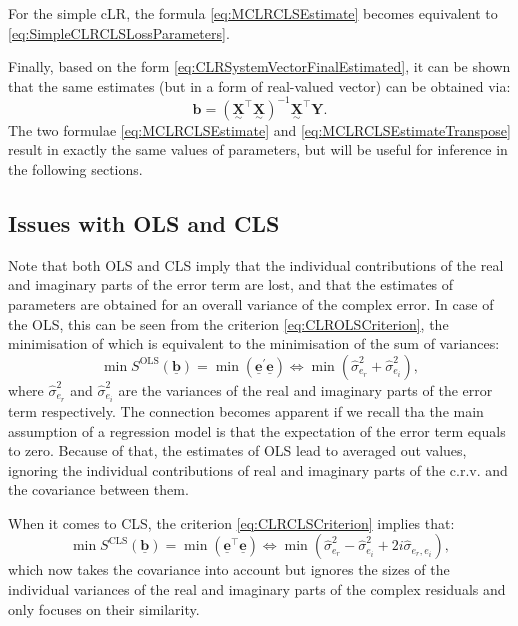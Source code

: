 \documentclass[
]{book}
\begin{document}
For the simple cLR, the formula \eqref{eq:MCLRCLSEstimate} becomes equivalent to \eqref{eq:SimpleCLRCLSLossParameters}.

Finally, based on the form \eqref{eq:CLRSystemVectorFinalEstimated}, it can be shown that the same estimates (but in a form of real-valued vector) can be obtained via:
\begin{equation}
    \boldsymbol{b} = \left( \underset{\sim}{\mathbf{X}}^\top \underset{\sim}{\mathbf{X}}\right)^{-1} \underset{\sim}{\mathbf{{X}}}^\top {\mathbf{Y}} .
    \label{eq:MCLRCLSEstimateTranspose}
\end{equation}
The two formulae \eqref{eq:MCLRCLSEstimate} and \eqref{eq:MCLRCLSEstimateTranspose} result in exactly the same values of parameters, but will be useful for inference in the following sections.

\hypertarget{CLREstimationIssue}{%
\subsection{Issues with OLS and CLS}\label{CLREstimationIssue}}

Note that both OLS and CLS imply that the individual contributions of the real and imaginary parts of the error term are lost, and that the estimates of parameters are obtained for an overall variance of the complex error. In case of the OLS, this can be seen from the criterion \eqref{eq:CLROLSCriterion}, the minimisation of which is equivalent to the minimisation of the sum of variances:
\begin{equation}
    \min S^{\mathrm{OLS}}(\underline{\boldsymbol{b}}) = \min \left(\underline{\mathbf{e}}^\prime \underline{\mathbf{e}}\right) \iff \min \left(\hat{\sigma}_{e_r}^2 + \hat{\sigma}_{e_i}^2 \right),
    \label{eq:CLROLSCriterionVariance}
\end{equation}
where \(\hat{\sigma}_{e_r}^2\) and \(\hat{\sigma}_{e_i}^2\) are the variances of the real and imaginary parts of the error term respectively. The connection becomes apparent if we recall tha the main assumption of a regression model is that the expectation of the error term equals to zero. Because of that, the estimates of OLS lead to averaged out values, ignoring the individual contributions of real and imaginary parts of the c.r.v. and the covariance between them.

When it comes to CLS, the criterion \eqref{eq:CLRCLSCriterion} implies that:
\begin{equation}
    \min S^{\mathrm{CLS}}(\underline{\boldsymbol{b}}) = \min \left(\underline{\mathbf{e}}^\top \underline{\mathbf{e}}\right) \iff \min \left(\hat{\sigma}_{e_r}^2 - \hat{\sigma}_{e_i}^2 + 2i \hat{\sigma}_{e_r, e_i} \right),
    \label{eq:CLRCLSCriterionVariance}
\end{equation}
which now takes the covariance into account but ignores the sizes of the individual variances of the real and imaginary parts of the complex residuals and only focuses on their similarity.
\end{document}
